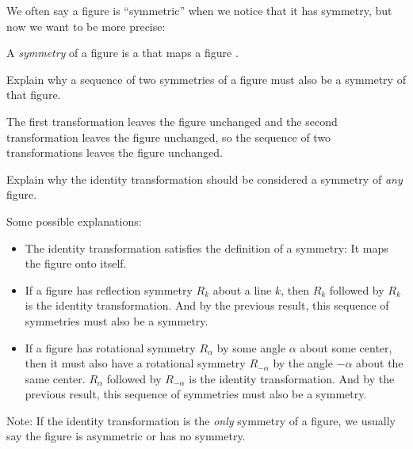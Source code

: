 \documentclass[nooutcomes]{ximera}
\begin{document}
\begin{question}
We often say a figure is ``symmetric'' when we notice that it has symmetry, but now we want to be more precise:  

A \emph{symmetry} of a figure is a
that maps a figure 
.  
\end{question}

\begin{question}
Explain why a sequence of two symmetries of a figure must also be a symmetry of that figure.  
\begin{freeResponse}
\begin{hint}
The first transformation leaves the figure unchanged and the second transformation leaves the figure unchanged, so the sequence of two transformations leaves the figure unchanged.  
\end{hint}
\end{freeResponse}
\end{question}

\begin{question}
Explain why the identity transformation should be considered a symmetry of \emph{any} figure.   
\begin{freeResponse}
\begin{hint}
Some possible explanations: 
\begin{itemize}
\item The identity transformation satisfies the definition of a symmetry: It maps the figure onto itself. 
\item If a figure has reflection symmetry $R_k$ about a line $k$, then $R_k$ followed by $R_k$ is the identity transformation.  And by the previous result, this sequence of symmetries must also be a symmetry.  
\item If a figure has rotational symmetry $R_\alpha$ by some angle $\alpha$ about some center, then it must also have a rotational symmetry $R_{-\alpha}$ by the angle $-\alpha$ about the same center.  $R_\alpha$ followed by $R_{-\alpha}$ is the identity transformation.  And by the previous result, this sequence of symmetries must also be a symmetry.  
\end{itemize}
\end{hint}
\end{freeResponse}
Note: If the identity transformation is the \emph{only} symmetry of a figure, we usually say the figure is asymmetric or has no symmetry.  
\end{question}
\end{document}
